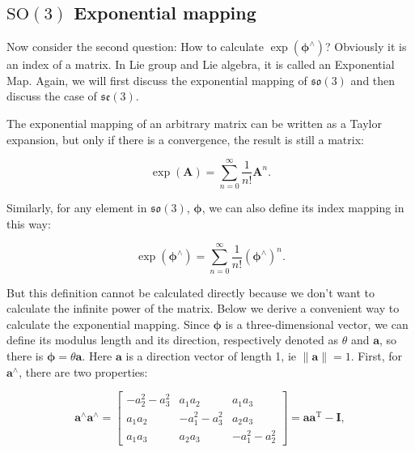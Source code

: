 \subsection{$\mathrm{SO}(3)$ Exponential mapping}

Now consider the second question: How to calculate $\exp ( \boldsymbol{\phi}^{\wedge} )$? Obviously it is an index of a matrix. In Lie group and Lie algebra, it is called an Exponential Map. Again, we will first discuss the exponential mapping of $\mathfrak{so}(3)$ and then discuss the case of $\mathfrak{se}(3)$.

The exponential mapping of an arbitrary matrix can be written as a Taylor expansion, but only if there is a convergence, the result is still a matrix:

\begin{equation}
\exp(\bm{A}) = \sum\limits_{n = 0}^\infty {\frac{1}{{n!}}{ \bm{A}^n}}.
\end{equation}

Similarly, for any element in $\mathfrak{so}(3)$, $\boldsymbol{\phi}$, we can also define its index mapping in this way:

\begin{equation}
\exp(\boldsymbol{\phi}^\wedge) = \sum\limits_{n = 0}^\infty {\frac{1}{{n!}}{ (\boldsymbol{\phi}^{\wedge })^n}}.
\end{equation}

But this definition cannot be calculated directly because we don't want to calculate the infinite power of the matrix. Below we derive a convenient way to calculate the exponential mapping. Since $\boldsymbol{\phi}$ is a three-dimensional vector, we can define its modulus length and its direction, respectively denoted as $\theta$ and $\bm{a}$, so there is $\boldsymbol{\phi} = \theta \bm{a}$. Here $\bm{a}$ is a direction vector of length 1, ie $\| \bm{a} \| =1$. First, for $\bm{a}^\wedge$, there are two properties: %

\begin{equation}
\bm{a}^{\wedge} \bm{a}^{\wedge} = \left[ {\begin{array}{*{20}{c}}
	{ - a_2^2 - a_3^2}&{{a_1}{a_2}}&{{a_1}{a_3}}\\
	{{a_1}{a_2}}&{ - a_1^2 - a_3^2}&{{a_2}{a_3}}\\
	{{a_1}{a_3}}&{{a_2}{a_3}}&{ - a_1^2 - a_2^2}
	\end{array}} \right] = \bm{a} \bm{a}^\mathrm{T} - \bm{I},
\end{equation}

